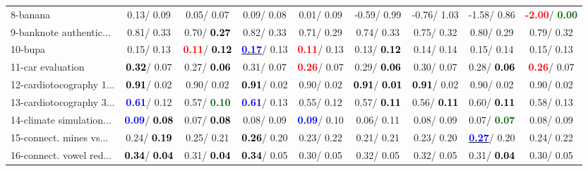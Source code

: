 \begin{table}[h]
\begin{center}
\begin{tabular}{lc|c|c|c|c|c|c|c}
8-banana &   0.13/  0.09 &   0.05/  0.07 &   0.09/  0.08 &   0.01/  0.09 &  -0.59/  0.99 &  -0.76/  1.03 &  -1.58/  0.86 & \textcolor{red}{\textbf{ -2.00}}/\textcolor{darkgreen}{\textbf{  0.00}} \\
9-banknote authentic... &   0.81/  0.33 &   0.70/\textcolor{black}{\textbf{  0.27}} &   0.82/  0.33 &   0.71/  0.29 &   0.74/  0.33 &   0.75/  0.32 &   0.80/  0.29 &   0.79/  0.32 \\
10-bupa &   0.15/  0.13 & \textcolor{red}{\textbf{  0.11}}/\textcolor{black}{\textbf{  0.12}} & \underline{\textcolor{blue}{\textbf{  0.17}}}/  0.13 & \textcolor{red}{\textbf{  0.11}}/  0.13 &   0.13/\textcolor{black}{\textbf{  0.12}} &   0.14/  0.14 &   0.15/  0.14 &   0.15/  0.13 \\
11-car evaluation & \textcolor{black}{\textbf{  0.32}}/  0.07 &   0.27/\textcolor{black}{\textbf{  0.06}} &   0.31/  0.07 & \textcolor{red}{\textbf{  0.26}}/  0.07 &   0.29/\textcolor{black}{\textbf{  0.06}} &   0.30/  0.07 &   0.28/\textcolor{black}{\textbf{  0.06}} & \textcolor{red}{\textbf{  0.26}}/  0.07 \\
12-cardiotocography 1... & \textcolor{black}{\textbf{  0.91}}/  0.02 &   0.90/  0.02 & \textcolor{black}{\textbf{  0.91}}/  0.02 &   0.90/  0.02 & \textcolor{black}{\textbf{  0.91}}/\textcolor{black}{\textbf{  0.01}} & \textcolor{black}{\textbf{  0.91}}/  0.02 &   0.90/  0.02 &   0.90/  0.02 \\
13-cardiotocography 3... & \textcolor{blue}{\textbf{  0.61}}/  0.12 &   0.57/\textcolor{darkgreen}{\textbf{  0.10}} & \textcolor{blue}{\textbf{  0.61}}/  0.13 &   0.55/  0.12 &   0.57/\textcolor{black}{\textbf{  0.11}} &   0.56/\textcolor{black}{\textbf{  0.11}} &   0.60/\textcolor{black}{\textbf{  0.11}} &   0.58/  0.13 \\
14-climate simulation... & \textcolor{blue}{\textbf{  0.09}}/\textcolor{black}{\textbf{  0.08}} &   0.07/\textcolor{black}{\textbf{  0.08}} &   0.08/  0.09 & \textcolor{blue}{\textbf{  0.09}}/  0.10 &   0.06/  0.11 &   0.08/  0.09 &   0.07/\textcolor{darkgreen}{\textbf{  0.07}} &   0.08/  0.09 \\ \hline
15-connect. mines vs... &   0.24/\textcolor{black}{\textbf{  0.19}} &   0.25/  0.21 & \textcolor{black}{\textbf{  0.26}}/  0.20 &   0.23/  0.22 &   0.21/  0.21 &   0.23/  0.20 & \underline{\textcolor{blue}{\textbf{  0.27}}}/  0.20 &   0.24/  0.22 \\
16-connect. vowel red... & \textcolor{black}{\textbf{  0.34}}/\textcolor{black}{\textbf{  0.04}} &   0.31/\textcolor{black}{\textbf{  0.04}} & \textcolor{black}{\textbf{  0.34}}/  0.05 &   0.30/  0.05 &   0.32/  0.05 &   0.32/  0.05 &   0.31/\textcolor{black}{\textbf{  0.04}} &   0.30/  0.05 \\

\end{tabular}
\end{center}
\end{table}
